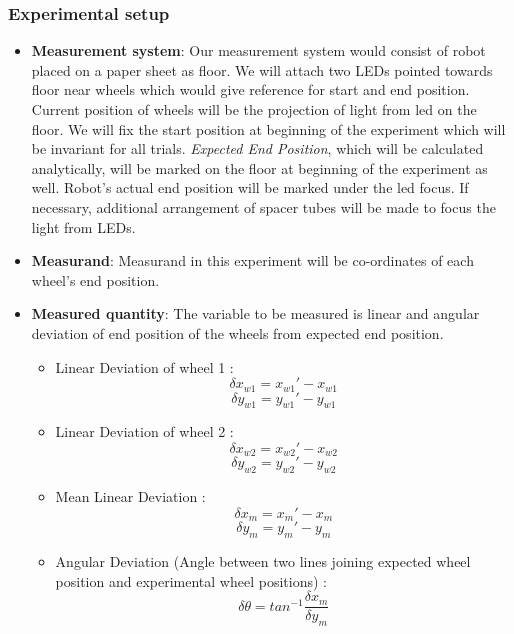 \documentclass[11pt,a4paper,openright,twoside]{extreport}
\begin{document}
\subsubsection*{Experimental setup}
\begin{itemize}
\item \textbf{Measurement system}: Our measurement system would consist of robot placed on a paper sheet as floor. We will attach two LEDs pointed towards floor near wheels which would give reference for start and end position. Current position of wheels will be the projection of light from led on the floor. We will fix the start position at beginning of the experiment which will be invariant for all trials. \textit{Expected End Position}, which will be calculated analytically, will be marked on the floor at beginning of the experiment as well. Robot's actual end position will be marked under the led focus. If necessary, additional arrangement of spacer tubes will be made to focus the light from LEDs. 

\item \textbf{Measurand}: Measurand in this experiment will be co-ordinates of each wheel's end position. 

\item \textbf{Measured quantity}: The variable to be measured is linear and angular deviation of end position of the wheels from expected end position. 
\begin{itemize}
	\item Linear Deviation of wheel 1 : 
	$$\delta x_{w1} = x_{w1}' - x_{w1}$$
	$$\delta y_{w1} = y_{w1}' - y_{w1}$$
	\item Linear Deviation of wheel 2 : 
	$$\delta x_{w2} = x_{w2}' - x_{w2}$$
	$$\delta y_{w2} = y_{w2}' - y_{w2}$$
	\item Mean Linear Deviation :  
	$$\delta x_{m} = x_{m}' - x_{m}$$
	$$\delta y_{m} = y_{m}' - y_{m}$$
	\item Angular Deviation (Angle between two lines joining expected wheel position and experimental wheel positions) : 
	$$\delta \theta = tan^{-1}\frac{\delta x_{m}}{\delta y_{m}}$$
\end{itemize}
\end{itemize}
\end{document}
